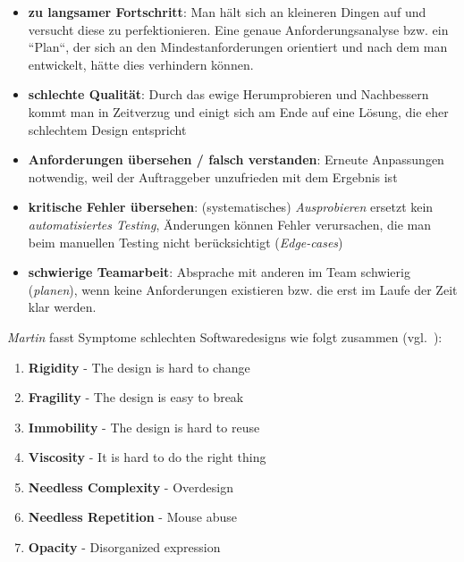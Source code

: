 \begin{itemize}
    \item \textbf{zu langsamer Fortschritt}: Man hält sich an kleineren Dingen auf und versucht diese zu perfektionieren.
    Eine genaue Anforderungsanalyse bzw. ein ``Plan``, der sich an den Mindestanforderungen orientiert und nach dem man entwickelt, hätte dies verhindern können.
    \item \textbf{schlechte Qualität}: Durch das ewige Herumprobieren und Nachbessern kommt man in Zeitverzug und einigt sich am Ende auf eine Lösung, die eher schlechtem Design entspricht
    \item  \textbf{Anforderungen übersehen / falsch verstanden}: Erneute Anpassungen notwendig, weil der Auftraggeber unzufrieden mit dem Ergebnis ist
    \item \textbf{kritische Fehler übersehen}: (systematisches) \textit{Ausprobieren} ersetzt kein \textit{automatisiertes Testing}, Änderungen können Fehler verursachen, die man beim manuellen Testing nicht berücksichtigt (\textit{Edge-cases})
    \item \textbf{schwierige Teamarbeit}: Absprache mit anderen im Team schwierig (\textit{planen}), wenn keine Anforderungen existieren bzw. die erst im Laufe der Zeit klar werden.
\end{itemize}


\begin{tcolorbox}[title=Symptoms of poor Dessign]
    \textit{Martin} fasst Symptome schlechten Softwaredesigns wie folgt zusammen (vgl.~\cite[85]{Mar03}):

    \begin{enumerate}
        \item \textbf{Rigidity} - The design is hard to change
        \item \textbf{Fragility} - The design is easy to break
        \item \textbf{Immobility} - The design is hard to reuse
        \item \textbf{Viscosity} - It is hard to do the right thing
        \item \textbf{Needless Complexity} - Overdesign
        \item \textbf{Needless Repetition} - Mouse abuse
        \item \textbf{Opacity} - Disorganized expression
    \end{enumerate}
\end{tcolorbox}

